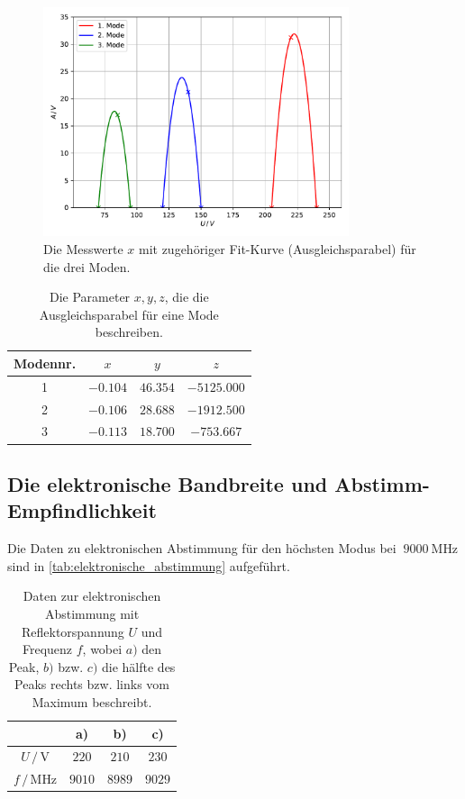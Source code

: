 \begin{figure}
    \centering
    \includegraphics[width=0.8\textwidth]{content/data/moden.pdf}
    \caption{Die Messwerte $x$ mit zugehöriger Fit-Kurve (Ausgleichsparabel) für die drei Moden. \cite{matplotlib}\cite{numpy}}
    \label{fig:moden}
\end{figure}

\begin{table}
    \centering
    \caption{Die Parameter $x, y, z$, die die Ausgleichsparabel für eine Mode beschreiben.}
    \begin{tabular}{c c c c}
        \toprule
        Modennr. & $x$ & $y$ & $z$ \\
        \midrule
        1 & $-0.104$ & $46.354$ & $-5125.000$ \\
        2 & $-0.106$ & $28.688$ & $-1912.500$ \\
        3 & $-0.113$ & $18.700$ & $-753.667$ \\
        \bottomrule
    \end{tabular}
    \label{tab:moden_ergebnisse}
\end{table}
\FloatBarrier

\subsection{Die elektronische Bandbreite und Abstimm-Empfindlichkeit}
Die Daten zu elektronischen Abstimmung für den höchsten Modus bei $~\SI{9000}{\mega\hertz}$ sind in \autoref{tab:elektronische_abstimmung} aufgeführt.
\begin{table}
    \centering
    \caption{Daten zur elektronischen Abstimmung mit Reflektorspannung $U$ und Frequenz $f$, wobei $a)$ den Peak, $b)$ bzw. $c)$ die hälfte des Peaks rechts bzw. links vom Maximum beschreibt.}
    \begin{tabular}{c c c c}
        \toprule
        & a) & b) & c) \\
        \midrule
        $U \,/\, \si{\volt}$ & $220$ & $210$ & $230$ \\
        $f \,/\, \si{\mega\hertz}$ & $9010$ & $8989$ & $9029$ \\
    \end{tabular}
    \label{tab:elektronische_abstimmung}
\end{table}

